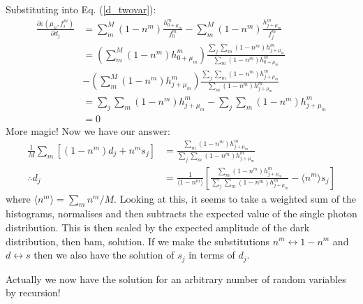 \documentclass[11pt]{article}
\begin{document}
Substituting into Eq. (\ref{d_twovar}):
\begin{align}
   \frac{\partial \varepsilon(\mu_n, f^m_i)}{\partial d_j} &= \sum_m^M (1-n^m) \frac{ h^m_{0+\mu_m}}{f^m_0}-\sum_m^M (1-n^m) \frac{ h^m_{j+\mu_m}}{f^m_j} \\
   &=  \left(\sum_m^M (1-n^m) h^m_{0+\mu_m}\right) \frac{\sum_{j}\sum_m (1-n^m) h^m_{j+\mu_m}}{\sum_m (1-n^m)h^m_{0+\mu_m}} \\
   & - \left(\sum_m^M (1-n^m) h^m_{j+\mu_m}\right) \frac{\sum_{j}\sum_m (1-n^m) h^m_{j+\mu_m}}{\sum_m (1-n^m)h^m_{j+\mu_m}} \\
   &=  \sum_{j}\sum_m (1-n^m) h^m_{j+\mu_m} - \sum_{j}\sum_m (1-n^m) h^m_{j+\mu_m} \\
   &= 0
\end{align}
More magic! Now we have our answer:
\begin{align}
   \frac{1}{M}\sum_m \left[ (1-n^m)d_j + n^m s_j \right] &= \frac{\sum_m (1-n^m)h^m_{j+\mu_m}}{\sum_{j}\sum_m (1-n^m) h^m_{j+\mu_m}} \\
   \therefore d_j &= \frac{1}{\langle 1-n^m \rangle}\left[\frac{\sum_m (1-n^m)h^m_{j+\mu_m}}{\sum_{j}\sum_m (1-n^m) h^m_{j+\mu_m}} - \langle n^m \rangle s_j \right] 
\end{align}
where $\langle n^m \rangle = \sum_m n^m / M$. Looking at this, it seems to take a weighted sum of the histograms, normalises and then subtracts the expected value of the single photon distribution. This is then scaled by the expected amplitude of the dark distribution, then bam, solution. If we make the substitutions $n^m \leftrightarrow 1-n^m$ and $d \leftrightarrow s$ then we also have the solution of $s_j$ in terms of $d_j$. 

Actually we now have the solution for an arbitrary number of random variables by recursion!
\end{document}
